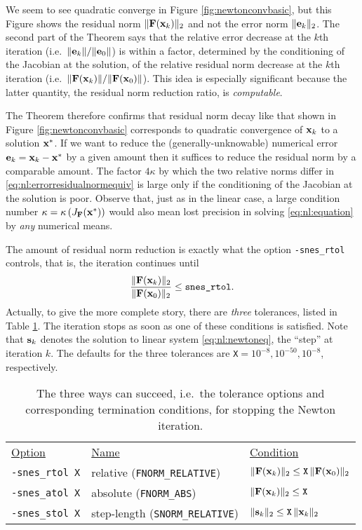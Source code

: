 We seem to see quadratic converge in Figure \ref{fig:newtonconvbasic}, but this Figure shows the residual norm $\|\mathbf{F}(\mathbf{x}_k)\|_2$ and not the error norm $\|\mathbf{e}_k\|_2$.  The second part of the Theorem says that the relative error decrease at the $k$th iteration (i.e.~$\|\mathbf{e}_k\|/\|\mathbf{e}_0\|$) is within a factor, determined by the conditioning of the Jacobian at the solution, of the relative residual norm decrease at the $k$th iteration (i.e.~$\|\mathbf{F}(\mathbf{x}_k)\|/\|\mathbf{F}(\mathbf{x}_0)\|$).  This idea is especially significant because the latter quantity, the residual norm reduction ratio, is \emph{computable}.

The Theorem therefore confirms that residual norm decay like that shown in Figure \ref{fig:newtonconvbasic} corresponds to quadratic convergence of $\mathbf{x}_k$ to a solution $\mathbf{x}^*$.  If we want to reduce the (generally-unknowable) numerical error $\mathbf{e}_k=\mathbf{x}_k-\mathbf{x}^*$ by a given amount then it suffices to reduce the residual norm by a comparable amount.  The factor $4 \kappa$ by which the two relative norms differ in \eqref{eq:nl:errorresidualnormequiv} is large only if the conditioning of the Jacobian at the solution is poor.  Observe that, just as in the linear case, a large condition number $\kappa=\kappa\left(J_{\mathbf{F}}(\mathbf{x}^*)\right)$ would also mean lost precision in solving \eqref{eq:nl:equation} by \emph{any} numerical means.

The amount of residual norm reduction is exactly what the option \texttt{-snes\_rtol} controls, that is, the iteration continues until
    $$\frac{\|\mathbf{F}(\mathbf{x}_k)\|_2}{\|\mathbf{F}(\mathbf{x}_0)\|_2} \le \text{\texttt{snes\_rtol}}.$$
Actually, to give the more complete story, there are \emph{three} \pSNES tolerances, listed in Table \ref{tab:snestolerances}.  The iteration stops as soon as one of these conditions is satisfied.  Note that $\mathbf{s}_k$ denotes the solution to linear system \eqref{eq:nl:newtoneq}, the ``step'' at iteration $k$.  The defaults for the three tolerances are \texttt{X}$=10^{-8},10^{-50},10^{-8}$, respectively.

\medskip
\begin{table}
\begin{tabular}{lll}
\underline{Option}\hspace{0.2in} & \underline{Name}\hspace{0.2in} & \underline{Condition}\hspace{0.2in} \\
\texttt{-snes\_rtol X} & relative (\texttt{FNORM\_RELATIVE}) & $\|\mathbf{F}(\mathbf{x}_k)\|_2 \le \text{\texttt{X}}\, \|\mathbf{F}(\mathbf{x}_0)\|_2$ \\
\texttt{-snes\_atol X} & absolute (\texttt{FNORM\_ABS}) & $\|\mathbf{F}(\mathbf{x}_k)\|_2 \le \text{\texttt{X}}$ \\
\texttt{-snes\_stol X} & step-length (\texttt{SNORM\_RELATIVE}) & $\|\mathbf{s}_k\|_2 \le \text{\texttt{X}}\, \|\mathbf{x}_k\|_2$
\end{tabular}
\caption{The three ways \pSNES can succeed, i.e.~the tolerance options and corresponding termination conditions, for stopping the Newton iteration.} \label{tab:snestolerances}
\end{table}

